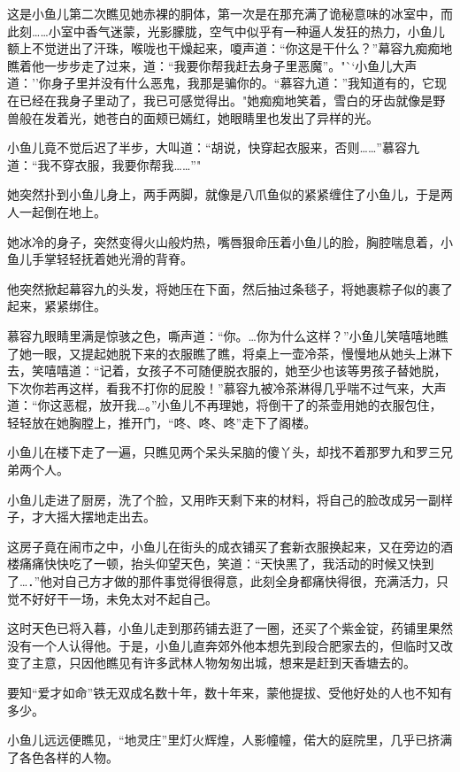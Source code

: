 \documentclass[12pt,oneside]{book}
\begin{document}
这是小鱼儿第二次瞧见她赤裸的胴体，第一次是在那充满了诡秘意味的冰室中，而此刻\ldots\ldots 小室中香气迷蒙，光影朦胧，空气中似乎有一种逼人发狂的热力，小鱼儿额上不觉迸出了汗珠，喉咙也干燥起来，嗄声道：``你这是干什么？''幕容九痴痴地瞧着他一步步走了过来，道：``我要你帮我赶去身子里恶魔''。"``小鱼儿大声道：''你身子里并没有什么恶鬼，我那是骗你的。``慕容九道：''我知道有的，它现在已经在我身子里动了，我已可感觉得出。"她痴痴地笑着，雪白的牙齿就像是野兽般在发着光，她苍白的面颊已嫣红，她眼睛里也发出了异样的光。

小鱼儿竟不觉后迟了半步，大叫道：``胡说，快穿起衣服来，否则\ldots\ldots{}''慕容九道：``我不穿衣服，我要你帮我\ldots\ldots{}''"

她突然扑到小鱼儿身上，两手两脚，就像是八爪鱼似的紧紧缠住了小鱼儿，于是两人一起倒在地上。

她冰冷的身子，突然变得火山般灼热，嘴唇狠命压着小鱼儿的脸，胸腔喘息着，小鱼儿手掌轻轻抚着她光滑的背脊。

他突然掀起幕容九的头发，将她压在下面，然后抽过条毯子，将她裹粽子似的裹了起来，紧紧绑住。

慕容九眼睛里满是惊骇之色，嘶声道：``你。\ldots 你为什么这样？''小鱼儿笑嘻嘻地瞧了她一眼，又提起她脱下来的衣服瞧了瞧，将桌上一壶冷茶，慢慢地从她头上淋下去，笑嘻嘻道：``记着，女孩子不可随便脱衣服的，她至少也该等男孩子替她脱，下次你若再这样，看我不打你的屁股！''慕容九被冷茶淋得几乎喘不过气来，大声道：``你这恶棍，放开我\ldots。''小鱼儿不再理她，将倒干了的茶壶用她的衣服包住，轻轻放在她胸膛上，推开门，``咚、咚、咚''走下了阁楼。

小鱼儿在楼下走了一遍，只瞧见两个呆头呆脑的傻丫头，却找不着那罗九和罗三兄弟两个人。

小鱼儿走进了厨房，洗了个脸，又用昨天剩下来的材料，将自己的脸改成另一副样子，才大摇大摆地走出去。

这房子竟在闹市之中，小鱼儿在街头的成衣铺买了套新衣服换起来，又在旁边的酒楼痛痛快快吃了一顿，抬头仰望天色，笑道：``天快黑了，我活动的时候又快到了\ldots．''他对自己方才做的那件事觉得很得意，此刻全身都痛快得很，充满活力，只觉不好好干一场，未免太对不起自己。

这时天色已将入暮，小鱼儿走到那药铺去逛了一圈，还买了个紫金锭，药铺里果然没有一个人认得他。于是，小鱼儿直奔郊外他本想先到段合肥家去的，但临时又改变了主意，只因他瞧见有许多武林人物匆匆出城，想来是赶到天香塘去的。

要知``爱才如命''铁无双成名数十年，数十年来，蒙他提拔、受他好处的人也不知有多少。

小鱼儿远远便瞧见，``地灵庄''里灯火辉煌，人影幢幢，偌大的庭院里，几乎已挤满了各色各样的人物。
\end{document}
